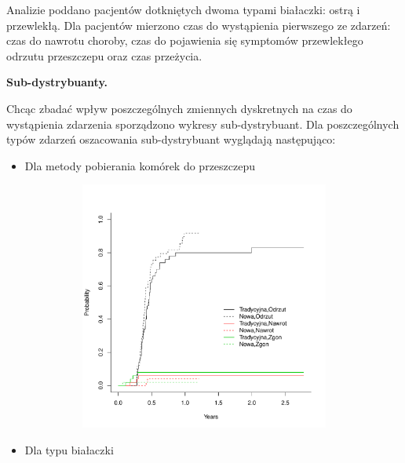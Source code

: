 \documentclass[]{article}
\title{}
\author{}
\date{}
\begin{document}
\maketitle


\thispagestyle{fancy} Analizie poddano pacjentów dotkniętych dwoma
typami białaczki: ostrą i przewlekłą. Dla pacjentów mierzono czas do
wystąpienia pierwszego ze zdarzeń: czas do nawrotu choroby, czas do
pojawienia się symptomów przewlekłego odrzutu przeszczepu oraz czas
przeżycia.

\vspace{10pt}

\textbf{Sub-dystrybuanty.}

Chcąc zbadać wpływ poszczególnych zmiennych dyskretnych na czas do
wystąpienia zdarzenia sporządzono wykresy sub-dystrybuant. Dla
poszczególnych typów zdarzeń oszacowania sub-dystrybuant wyglądają
następująco:

\begin{itemize}
\itemsep1pt\parskip0pt
\item
  Dla metody pobierania komórek do przeszczepu
\end{itemize}

\vspace{-22pt}

\includegraphics[width=16cm,height=8.2cm]{plot1.pdf}

\begin{itemize}
\itemsep1pt\parskip0pt
\item
  Dla typu białaczki
\end{itemize}

\vspace{-22pt}
\end{document}
